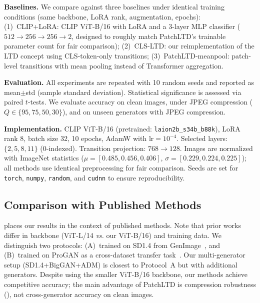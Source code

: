 \documentclass[runningheads]{llncs}
\newcommand{\ours}{PatchLTD}
\newcommand{\vs}{\textit{vs.}}
\begin{document}
\noindent\textbf{Baselines.}
We compare against three baselines under identical training conditions (same backbone, LoRA rank, augmentation, epochs):
(1)~CLIP+LoRA: CLIP ViT-B/16 with LoRA and a 3-layer MLP classifier ($512{\to}256{\to}256{\to}2$, designed to roughly match \ours{}'s trainable parameter count for fair comparison);
(2)~CLS-LTD: our reimplementation of the LTD concept using CLS-token-only transitions;
(3)~\ours{}-meanpool: patch-level transitions with mean pooling instead of Transformer aggregation.

\noindent\textbf{Evaluation.}
All experiments are repeated with 10 random seeds and reported as mean$\pm$std (sample standard deviation). Statistical significance is assessed via paired $t$-tests.
We evaluate accuracy on clean images, under JPEG compression ($Q \in \{95, 75, 50, 30\}$), and on unseen generators with JPEG compression.

\noindent\textbf{Implementation.}
CLIP ViT-B/16 (pretrained: \texttt{laion2b\_s34b\_b88k}), LoRA rank 8, batch size 32, 10 epochs, AdamW with $\text{lr}{=}10^{-4}$.
Selected layers: $\{2, 5, 8, 11\}$ (0-indexed).
Transition projection: $768 \to 128$.
Images are normalized with ImageNet statistics ($\mu{=}[0.485, 0.456, 0.406]$, $\sigma{=}[0.229, 0.224, 0.225]$); all methods use identical preprocessing for fair comparison.
Seeds are set for \texttt{torch}, \texttt{numpy}, \texttt{random}, and \texttt{cudnn} to ensure reproducibility.


\subsection{Comparison with Published Methods}
\label{sec:published}

 places our results in the context of published methods.
Note that prior works differ in backbone (ViT-L/14 \vs{} our ViT-B/16) and training data.
We distinguish two protocols: (A)~trained on SD1.4 from GenImage~\cite{zhu2024genimage}, and (B)~trained on ProGAN as a cross-dataset transfer task~\cite{yang2026ltd}.
Our multi-generator setup (SD1.4+BigGAN+ADM) is closest to Protocol~A but with additional generators.
Despite using the smaller ViT-B/16 backbone, our methods achieve competitive accuracy; the main advantage of \ours{} is compression robustness (), not cross-generator accuracy on clean images.
\end{document}
